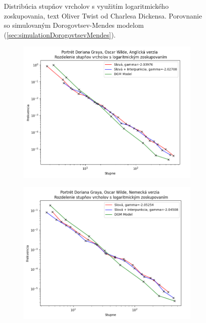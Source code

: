 \begin{figure}[htbp]
    \vspace{0.3cm}
    \caption{Distribúcia stupňov vrcholov s využitím logaritmického zoskupovania, text Oliver Twist od Charlesa Dickensa. Porovnanie so simulovaným Dorogovtsev-Mendes modelom (\ref{sec:simulationDorogovtsevMendes}).}\label{fig:lbdegdistTwist}
\end{figure}

\begin{figure}[htbp]
    \centering
    \begin{subfigure}[b]{0.9\textwidth}
        \includegraphics[width=\textwidth]{images/lbdegdist/Screenshot_3.png}
    \end{subfigure}

    \vspace{0.3cm}

    \begin{subfigure}[b]{0.9\textwidth}
        \includegraphics[width=\textwidth]{images/lbdegdist/Screenshot_4.png}
    \end{subfigure}
    

\end{figure}
